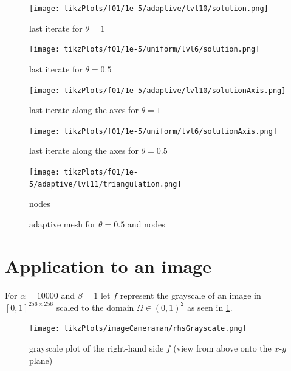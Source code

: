 \documentclass[draft=false,twoside,12pt]{scrreprt}
\begin{document}
\begin{minipage}[t]{0.45\textwidth}
  \begin{figure}[H]
	  \centering
		\texttt{[image: tikzPlots/f01/1e-5/adaptive/lvl10/solution.png]} 
    \caption{last iterate for $\theta = 1$}
  \end{figure}
\end{minipage}
\begin{minipage}[t]{0.45\textwidth}
  \begin{figure}[H]
	  \centering
		\texttt{[image: tikzPlots/f01/1e-5/uniform/lvl6/solution.png]} 
    \caption{last iterate for $\theta = 0.5$}
  \end{figure}
\end{minipage}

\begin{minipage}[t]{0.45\textwidth}
  \begin{figure}[H]
	  \centering
		\texttt{[image: tikzPlots/f01/1e-5/adaptive/lvl10/solutionAxis.png]} 
    \caption{last iterate along the axes for $\theta = 1$}
  \end{figure}
\end{minipage}
\begin{minipage}[t]{0.45\textwidth}
  \begin{figure}[H]
	  \centering
		\texttt{[image: tikzPlots/f01/1e-5/uniform/lvl6/solutionAxis.png]} 
    \caption{last iterate along the axes for $\theta = 0.5$}
  \end{figure}
\end{minipage}

\begin{figure}[H]
	\centering
	\texttt{[image: tikzPlots/f01/1e-5/adaptive/lvl11/triangulation.png]}
  \caption{adaptive mesh for $\theta = 0.5$ and nodes}
   nodes
\end{figure}

\section{Application to an image}
For $\alpha = 10000$ and $\beta = 1$ let $f$ represent the grayscale of an 
image in $[0,1]^{256\times 256}$ scaled to the domain $\Omega\in(0,1)^2$ as
seen in \cref{fig:rhsCameraman}.

\begin{figure}[H]
	\centering
	\texttt{[image: tikzPlots/imageCameraman/rhsGrayscale.png]}
  \caption{grayscale plot of the right-hand side $f$ (view from above onto the
  $x$-$y$ plane)}
  \label{fig:rhsCameraman}
\end{figure}
\end{document}
